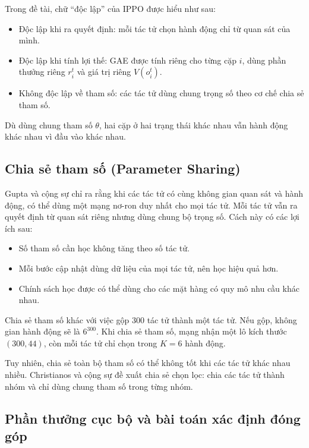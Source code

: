Trong đề tài, chữ ``độc lập'' của IPPO được hiểu như sau:
\begin{itemize}
    \item Độc lập khi ra quyết định: mỗi tác tử chọn hành động chỉ từ quan sát của mình.
    \item Độc lập khi tính lợi thế: GAE được tính riêng cho từng cặp $i$, dùng phần thưởng riêng $r_i^t$ và giá trị riêng $V(o_i^t)$.
    \item Không độc lập về tham số: các tác tử dùng chung trọng số theo cơ chế chia sẻ tham số.
\end{itemize}

Dù dùng chung tham số $\theta$, hai cặp ở hai trạng thái khác nhau vẫn hành động khác nhau vì đầu vào khác nhau.

\subsection{Chia sẻ tham số (Parameter Sharing)}
\label{subsec:paramSharing}

Gupta và cộng sự \cite{gupta2017} chỉ ra rằng khi các tác tử có cùng không gian quan sát và hành động, có thể dùng một mạng nơ-ron duy nhất cho mọi tác tử. Mỗi tác tử vẫn ra quyết định từ quan sát riêng nhưng dùng chung bộ trọng số. Cách này có các lợi ích sau:
\begin{itemize}
    \item Số tham số cần học không tăng theo số tác tử.
    \item Mỗi bước cập nhật dùng dữ liệu của mọi tác tử, nên học hiệu quả hơn.
    \item Chính sách học được có thể dùng cho các mặt hàng có quy mô nhu cầu khác nhau.
\end{itemize}

Chia sẻ tham số khác với việc gộp 300 tác tử thành một tác tử. Nếu gộp, không gian hành động sẽ là $6^{300}$. Khi chia sẻ tham số, mạng nhận một lô kích thước $(300, 44)$, còn mỗi tác tử chỉ chọn trong $K = 6$ hành động.

Tuy nhiên, chia sẻ toàn bộ tham số có thể không tốt khi các tác tử khác nhau nhiều. Christianos và cộng sự \cite{christianos2021seps} đề xuất chia sẻ chọn lọc: chia các tác tử thành nhóm và chỉ dùng chung tham số trong từng nhóm.

\subsection{Phần thưởng cục bộ và bài toán xác định đóng góp}
\label{subsec:rewardDecomposition}

